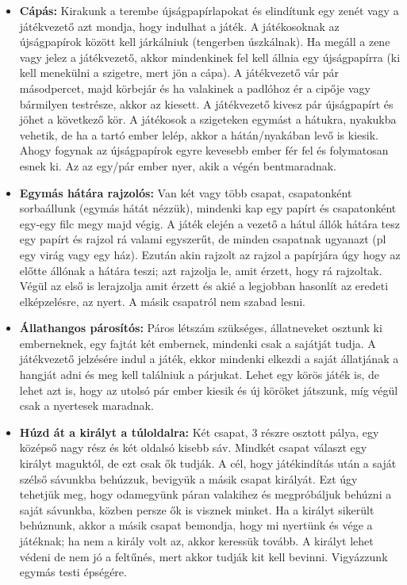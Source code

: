 \documentclass[a4paper, 12pt, twoside, openright]{article}
\begin{document}
\begin{itemize}
\item \textbf{Cápás:} Kirakunk a terembe újságpapírlapokat és elindítunk egy zenét vagy a játékvezető azt mondja, hogy indulhat a játék. A játékosoknak az újságpapírok között kell járkálniuk (tengerben úszkálnak). Ha megáll a zene vagy jelez a játékvezető, akkor mindenkinek fel kell állnia egy újságpapírra (ki kell menekülni a szigetre, mert jön a cápa). A játékvezető vár pár másodpercet, majd körbejár és ha valakinek a padlóhoz ér a cipője vagy bármilyen testrésze, akkor az kiesett. A játékvezető kivesz pár újságpapírt és jöhet a következő kör. A játékosok a szigeteken egymást a hátukra, nyakukba vehetik, de ha a tartó ember lelép, akkor a hátán/nyakában levő is kiesik. Ahogy fogynak az újságpapírok egyre kevesebb ember fér fel és folymatosan esnek ki. Az az egy/pár ember nyer, akik a végén bentmaradnak.

\item \textbf{Egymás hátára rajzolós:} Van két vagy több csapat, csapatonként sorbaállunk (egymás hátát nézzük), mindenki kap egy papírt és csapatonként egy-egy filc megy majd végig. A játék elején a vezető a hátul állók hátára tesz egy papírt és rajzol rá valami egyszerűt, de minden csapatnak ugyanazt (pl egy virág vagy egy ház). Ezután akin rajzolt az rajzol a papírjára úgy hogy az előtte állónak a hátára teszi; azt rajzolja le, amit érzett, hogy rá rajzoltak. Végül az első is lerajzolja amit érzett és akié a legjobban hasonlít az eredeti elképzelésre, az nyert. A másik csapatról nem szabad lesni.

\item \textbf{Állathangos párosítós:} Páros létszám szükséges, állatneveket osztunk ki emberneknek, egy fajtát két embernek, mindenki csak a sajátját tudja. A játékvezető jelzésére indul a játék, ekkor mindenki elkezdi a saját állatjának a hangját adni és meg kell találniuk a párjukat. Lehet egy körös játék is, de lehet azt is, hogy az utolsó pár ember kiesik és új köröket játszunk, míg végül csak a nyertesek maradnak.

\item \textbf{Húzd át a királyt a túloldalra:} Két csapat, 3 részre osztott pálya, egy középső nagy rész és két oldalsó kisebb sáv. Mindkét csapat választ egy királyt maguktól, de ezt csak ők tudják. A cél, hogy játékindítás után a saját szélső sávunkba behúzzuk, bevigyük a másik csapat királyát. Ezt úgy tehetjük meg, hogy odamegyünk páran valakihez és megpróbáljuk behúzni a saját sávunkba, közben persze ők is visznek minket. Ha a királyt sikerült behúznunk, akkor a másik csapat bemondja, hogy mi nyertünk és vége a játéknak; ha nem a király volt az, akkor keressük tovább. A királyt lehet védeni de nem jó a feltűnés, mert akkor tudják kit kell bevinni. Vigyázzunk egymás testi épségére.


\end{itemize}
\end{document}
